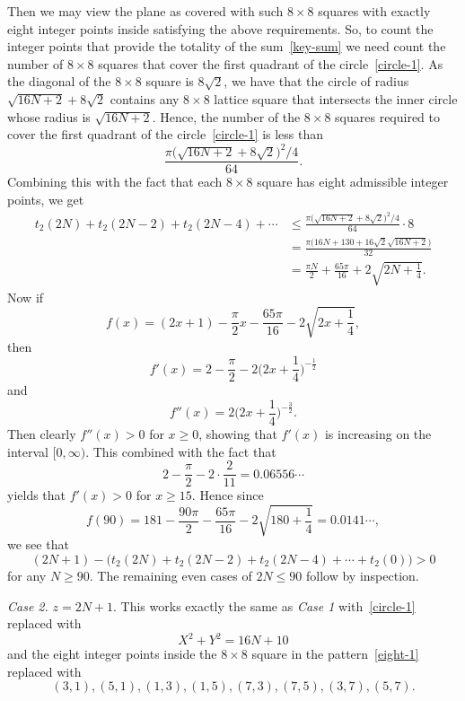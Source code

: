 \documentclass[reqno]{amsart}
\theoremstyle{definition}
\theoremstyle{plain}
\theoremstyle{remark}
\numberwithin{equation}{section}
\newcommand{\fr}{\frac}
\begin{document}
Then we may view the plane as covered with such $8\times 8$ squares with exactly eight integer points
inside satisfying the above requirements. So, to count the integer points that provide the totality of the sum~\eqref{key-sum}
we need count the number of $8\times 8$ squares that cover the first quadrant of the circle~\eqref{circle-1}.
As the diagonal of the $8\times 8$ square is $8\sqrt{2}$, we have that the circle of radius $\sqrt{16N+2} + 8\sqrt{2}$ contains any $8\times 8$ lattice square that intersects the inner circle whose radius is $\sqrt{16N+2}$.
Hence, the number of the $8\times 8$ squares required to cover the first quadrant of the circle~\eqref{circle-1} is less than
\[
\fr{\pi\big( \sqrt{16N+2}+8\sqrt{2}\big)^2/4}{64}.
\]
Combining this with the fact that each $8\times 8$ square has eight admissible integer points, we get
\begin{align}
t_2(2N)+t_2(2N-2)+t_2(2N-4)+\cdots
&\leq \fr{\pi\big( \sqrt{16N+2}+8\sqrt{2}\big)^2/4}{64} \cdot 8 \nonumber \\
&=\fr{\pi \big( 16N+130+16\sqrt{2}\sqrt{16N+2} \big)}{32} \nonumber \\
&=\fr{\pi N}{2} +\fr{65 \pi}{16}+ 2\sqrt{2N+\fr{1}{4}} \label{sum-inequality}.
\end{align}
Now if
\[
f(x)=(2x+1)-\fr{\pi}{2} x -\fr{65 \pi}{16} - 2\sqrt{2x+\fr{1}{4}},
\]
then
\[
f'(x)=2-\fr{\pi}{2}-2\Big( 2x+\fr{1}{4} \Big)^{-\fr{1}{2}}
\]
and
\[
f''(x)= 2\Big( 2x+\fr{1}{4} \Big)^{-\fr{3}{2}}.
\]
Then clearly $f''(x) >0$ for $x\geq 0$, showing that $f'(x)$ is increasing on the interval $[0,\infty)$.
This combined with the fact that
\[
2-\fr{\pi}{2} -2\cdot \fr{2}{11} =0.06556\cdots
\]
yields that $f'(x) >0$ for $x\geq 15$.
Hence since
\[
f(90)=181-\fr{90 \pi}{2}-\fr{65 \pi}{16}-2\sqrt{180+\fr{1}{4}}
=0.0141\cdots,
\]
we see that
\[
(2N+1)-\Big(t_2(2N)+t_2(2N-2)+t_2(2N-4)+\cdots+t_2(0) \Big) > 0
\]
for any $N\geq 90$. The remaining even cases of $2N \leq 90$ follow by inspection.

\emph{Case 2.} $z=2N+1$. This works exactly the same as \emph{Case 1} with~\eqref{circle-1} replaced with
\begin{equation}\label{circle-2}
X^2 + Y^2 = 16N+10
\end{equation}
and the eight integer points inside the $8\times 8$ square in the pattern~\eqref{eight-1} replaced with
\begin{equation}\label{eight-1}
(3,1),(5,1),(1,3),(1,5), (7,3), (7,5), (3,7),(5,7).
\end{equation}
\end{document}
